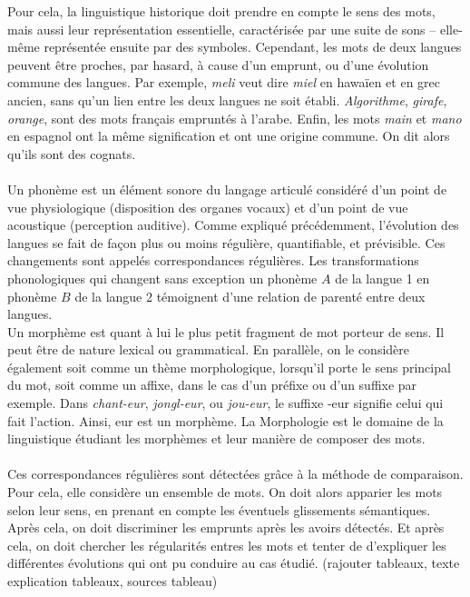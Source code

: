 \documentclass[12pt, french, twoside]{report}
\begin{document}
\indent Pour cela, la linguistique historique doit prendre en compte le sens des mots, mais aussi leur représentation essentielle, caractérisée par une suite de sons -- elle-même représentée ensuite par des symboles. Cependant, les mots de deux langues peuvent être proches, par hasard, à cause d'un emprunt, ou d'une évolution commune des langues.
Par exemple, \textit{meli} veut dire \textit{miel} en hawaïen et en grec ancien, sans qu'un lien entre les deux langues ne soit établi. \textit{Algorithme}, \textit{girafe}, \textit{orange}, sont des mots français empruntés à l'arabe. Enfin, les mots \textit{main} et \textit{mano} en espagnol ont la même signification et ont une origine commune. On dit alors qu'ils sont des cognats.\\ \\ 
\indent Un phonème est un élément sonore du langage articulé considéré d'un point de vue physiologique (disposition des organes vocaux) et d'un point de vue acoustique (perception auditive). Comme expliqué précédemment, l'évolution des langues se fait de façon plus ou moins régulière, quantifiable, et prévisible. Ces changements sont appelés correspondances régulières. Les transformations phonologiques qui changent sans exception un phonème $A$ de la langue 1 en phonème $B$ de la langue 2 témoignent d'une relation de parenté entre deux langues.\\
\indent Un morphème est quant à lui le plus petit fragment de mot porteur de sens. Il peut être de nature lexical ou grammatical. En parallèle, on le considère également soit comme un thème morphologique, lorsqu'il porte le sens principal du mot, soit comme un affixe, dans le cas d'un préfixe ou d'un suffixe par exemple. Dans \textit{chant-eur}, \textit{jongl-eur}, ou \textit{jou-eur}, le suffixe  \og -eur \fg signifie celui qui fait l'action. Ainsi, \og eur \fg est un morphème. La Morphologie est le domaine de la linguistique étudiant les morphèmes et leur manière de composer des mots. \\ \\ 
\indent Ces correspondances régulières sont détectées grâce à la méthode de comparaison. Pour cela, elle considère un ensemble de mots. On doit alors apparier les mots selon leur sens, en prenant en compte les éventuels glissements sémantiques. Après cela, on doit discriminer les emprunts après les avoirs détectés. Et après cela, on doit chercher les régularités entres les mots et tenter de d'expliquer les différentes évolutions qui ont pu conduire au cas étudié. (rajouter tableaux, texte explication tableaux, sources tableau)\\
\end{document}
